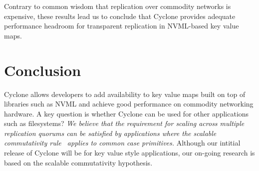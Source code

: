 \documentclass[letterpaper,twocolumn,10pt]{article}
\begin{document}
Contrary to common wisdom that replication over commodity networks is expensive,
these results lead us to conclude that Cyclone provides adequate performance
headroom for transparent replication in NVML-based key value maps.

\section{Conclusion}
Cyclone allows developers to add availability to key value maps built on top of
libraries such as NVML and achieve good performance on commodity networking
hardware. A key question is whether Cyclone can be used for other applications
such as filesystems? \emph{We believe that the requirement for scaling across
  multiple replication quorums can be satisfied by applications where the
  scalable commutativity rule~\cite{scalable_commutativity} applies to common
  case primitives.} Although our intitial release of Cyclone will be for key
value style applications, our on-going research is based on the scalable
commutativity hypothesis.
\newcommand\myurl[2]{\url{#1}}


\end{document}
